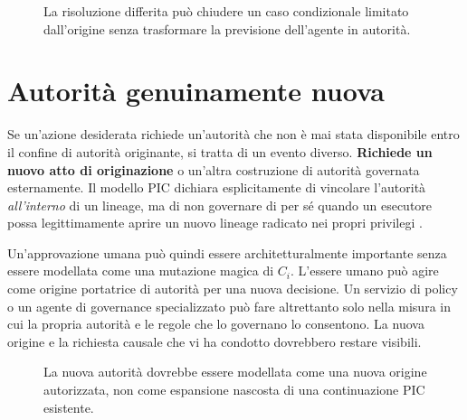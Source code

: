 \documentclass[10pt,oneside,openany]{book}
\begin{document}
\begin{figure}[ht]
\centering
{}
\caption{La risoluzione differita può chiudere un caso condizionale limitato dall'origine senza trasformare la previsione dell'agente in autorità.}
\end{figure}

\section{Autorità genuinamente nuova}
Se un'azione desiderata richiede un'autorità che non è mai stata disponibile entro il confine di autorità originante, si tratta di un evento diverso. \textbf{Richiede un nuovo atto di originazione} o un'altra costruzione di autorità governata esternamente. Il modello PIC dichiara esplicitamente di vincolare l'autorità \emph{all'interno} di un lineage, ma di non governare di per sé quando un esecutore possa legittimamente aprire un nuovo lineage radicato nei propri privilegi \cite{gallo2026pic}.

Un'approvazione umana può quindi essere architetturalmente importante senza essere modellata come una mutazione magica di $C_i$. L'essere umano può agire come origine portatrice di autorità per una nuova decisione. Un servizio di policy o un agente di governance specializzato può fare altrettanto solo nella misura in cui la propria autorità e le regole che lo governano lo consentono. La nuova origine e la richiesta causale che vi ha condotto dovrebbero restare visibili.

\begin{figure}[ht]
\centering
{}
\caption{La nuova autorità dovrebbe essere modellata come una nuova origine autorizzata, non come espansione nascosta di una continuazione PIC esistente.}
\end{figure}
\end{document}
